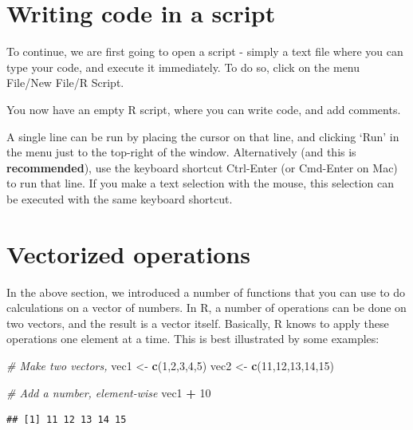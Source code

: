 \documentclass[]{book}
\newenvironment{Shaded}{\begin{snugshade}}{\end{snugshade}}
\newcommand{\CommentTok}[1]{\textcolor[rgb]{0.56,0.35,0.01}{\textit{#1}}}
\newcommand{\DecValTok}[1]{\textcolor[rgb]{0.00,0.00,0.81}{#1}}
\newcommand{\KeywordTok}[1]{\textcolor[rgb]{0.13,0.29,0.53}{\textbf{#1}}}
\newcommand{\NormalTok}[1]{#1}
\newcommand{\OperatorTok}[1]{\textcolor[rgb]{0.81,0.36,0.00}{\textbf{#1}}}
\newcommand{\StringTok}[1]{\textcolor[rgb]{0.31,0.60,0.02}{#1}}
\begin{document}
\hypertarget{writing-code-in-a-script}{%
\section{Writing code in a script}\label{writing-code-in-a-script}}

To continue, we are first going to open a script - simply a text file where you can type your code, and execute it immediately. To do so, click on the menu File/New File/R Script.

You now have an empty R script, where you can write code, and add comments.

A single line can be run by placing the cursor on that line, and clicking `Run' in the menu just to the top-right of the window. Alternatively (and this is \textbf{recommended}), use the keyboard shortcut Ctrl-Enter (or Cmd-Enter on Mac) to run that line. If you make a text selection with the mouse, this selection can be executed with the same keyboard shortcut.

\hypertarget{vectorized}{%
\section{Vectorized operations}\label{vectorized}}

In the above section, we introduced a number of functions that you can use to do calculations on a vector of numbers. In R, a number of operations can be done on two vectors, and the result is a vector itself. Basically, R knows to apply these operations one element at a time. This is best illustrated by some examples:

\begin{Shaded}
\begin{Highlighting}[]
\CommentTok{# Make two vectors,}
\NormalTok{vec1 <-}\StringTok{ }\KeywordTok{c}\NormalTok{(}\DecValTok{1}\NormalTok{,}\DecValTok{2}\NormalTok{,}\DecValTok{3}\NormalTok{,}\DecValTok{4}\NormalTok{,}\DecValTok{5}\NormalTok{)}
\NormalTok{vec2 <-}\StringTok{ }\KeywordTok{c}\NormalTok{(}\DecValTok{11}\NormalTok{,}\DecValTok{12}\NormalTok{,}\DecValTok{13}\NormalTok{,}\DecValTok{14}\NormalTok{,}\DecValTok{15}\NormalTok{)}

\CommentTok{# Add a number, element-wise}
\NormalTok{vec1 }\OperatorTok{+}\StringTok{ }\DecValTok{10}
\end{Highlighting}
\end{Shaded}

\begin{verbatim}
## [1] 11 12 13 14 15
\end{verbatim}
\end{document}
